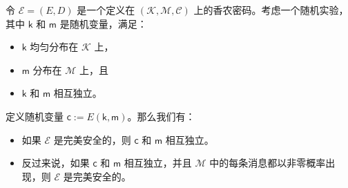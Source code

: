 \begin{theorem}\label{theo:2-4}
令 $\mathcal{E}=(E,D)$ 是一个定义在 $(\mathcal{K},\mathcal{M},\mathcal{C})$ 上的香农密码。考虑一个随机实验，其中 $\boldsymbol{\mathsf{k}}$ 和 $\boldsymbol{\mathsf{m}}$ 是随机变量，满足：
\begin{itemize}
	\item $\boldsymbol{\mathsf{k}}$ 均匀分布在 $\mathcal{K}$ 上，
	\item $\boldsymbol{\mathsf{m}}$ 分布在 $\mathcal{M}$ 上，且
	\item $\boldsymbol{\mathsf{k}}$ 和 $\boldsymbol{\mathsf{m}}$ 相互独立。
\end{itemize}
定义随机变量 $\boldsymbol{\mathsf{c}}:=E(\boldsymbol{\mathsf{k}},\boldsymbol{\mathsf{m}})$。那么我们有：
\begin{itemize}
	\item 如果 $\mathcal{E}$ 是完美安全的，则 $\boldsymbol{\mathsf{c}}$ 和 $\boldsymbol{\mathsf{m}}$ 相互独立。
	\item 反过来说，如果 $\boldsymbol{\mathsf{c}}$ 和 $\boldsymbol{\mathsf{m}}$ 相互独立，并且 $\mathcal{M}$ 中的每条消息都以非零概率出现，则 $\mathcal{E}$ 是完美安全的。
\end{itemize}
\end{theorem}

